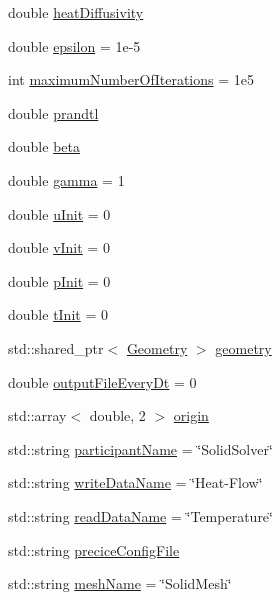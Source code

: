 \begin{DoxyCompactItemize}
\item 
double \mbox{\hyperlink{structSettings_a78b0b946b0d5532e7ad0365a2139cba1}{heat\+Diffusivity}}
\item 
double \mbox{\hyperlink{structSettings_aa02bd91d026d9ded9e36004b41b068b1}{epsilon}} = 1e-\/5
\item 
int \mbox{\hyperlink{structSettings_ac118e1c6052e35fb0ee38547a85d84ba}{maximum\+Number\+Of\+Iterations}} = 1e5
\item 
double \mbox{\hyperlink{structSettings_a57d3b4d55a18381eaa9ee1bf88f5f80c}{prandtl}}
\item 
double \mbox{\hyperlink{structSettings_a45307d3dcb2847f242815018498e3532}{beta}}
\item 
double \mbox{\hyperlink{structSettings_a626bd5aa12e49526b8a87ae6df5db79c}{gamma}} = 1
\item 
double \mbox{\hyperlink{structSettings_a7a7447a52d2b65636ea4a36378e18038}{u\+Init}} = 0
\item 
double \mbox{\hyperlink{structSettings_aa7b1e081e14588a401b4d8d6a7cda56b}{v\+Init}} = 0
\item 
double \mbox{\hyperlink{structSettings_a1821e0d9d4fac1a25e357048536626fc}{p\+Init}} = 0
\item 
double \mbox{\hyperlink{structSettings_ae914cbf337d6cf2f4bbe0acbcdd41e28}{t\+Init}} = 0
\item 
std\+::shared\+\_\+ptr$<$ \mbox{\hyperlink{classGeometry}{Geometry}} $>$ \mbox{\hyperlink{structSettings_ad8be2c34e77ce3ef9eb995a28eac3b3e}{geometry}}
\item 
double \mbox{\hyperlink{structSettings_a0e6a7871fa07786983bfcd08835122a0}{output\+File\+Every\+Dt}} = 0
\item 
std\+::array$<$ double, 2 $>$ \mbox{\hyperlink{structSettings_a517d878629c3f9f481251b4d274c2932}{origin}}
\item 
std\+::string \mbox{\hyperlink{structSettings_a155c7d8aa484cfb32c3e8735a4ec68eb}{participant\+Name}} = \char`\"{}Solid\+Solver\char`\"{}
\item 
std\+::string \mbox{\hyperlink{structSettings_ac8ea06951df9df0dad0c7850c606fd1f}{write\+Data\+Name}} = \char`\"{}Heat-\/Flow\char`\"{}
\item 
std\+::string \mbox{\hyperlink{structSettings_a85b8414e900d5c5f43b5eab64c0f10d6}{read\+Data\+Name}} = \char`\"{}Temperature\char`\"{}
\item 
std\+::string \mbox{\hyperlink{structSettings_ab08be51946bcb91e3a41cdf7561dd7e5}{precice\+Config\+File}}
\item 
std\+::string \mbox{\hyperlink{structSettings_a211166ec7952984ef06c110b61b07075}{mesh\+Name}} = \char`\"{}Solid\+Mesh\char`\"{}
\end{DoxyCompactItemize}


